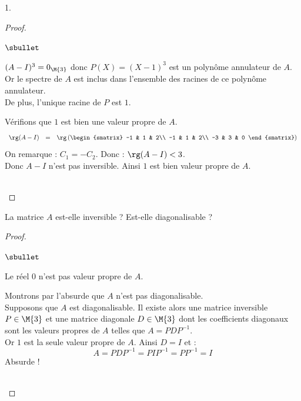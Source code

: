 \documentclass[11pt]{article}%
\begin{document}
\begin{noliste}{1.}
\begin{proof}~
\begin{noliste}{$\sbullet$}
\item $(A-I)^3=0_{\M{3}}$ donc $P(X)=(X-1)^3$ est un polynôme 
annulateur de $A$.\\
Or le spectre de $A$ est inclus dans l'ensemble des racines de ce 
polynôme 
annulateur.\\
De plus, l'unique racine de $P$ est $1$. 
\item Vérifions que $1$ est bien une valeur propre de $A$.
\[
\begin{array}{rcl}
  \rg(A-I) & = & \rg \left( 
    \begin{smatrix} 
      -1 & 1 & 2\\ 
      -1 & 1 & 2\\ 
      -3 & 3 & 0
    \end{smatrix} \right)
\end{array}
\]
On remarque : $C_1=-C_2$. Donc : $\rg(A-I)<3$.\\
Donc $A-I$ n'est pas inversible. Ainsi $1$ est bien valeur propre de
$A$.%
\end{noliste}

~\\[-1.4cm]
\end{proof}

\item La matrice $A$ est-elle inversible ? Est-elle diagonalisable ?

  \begin{proof}~
    \begin{noliste}{$\sbullet$}
    \item Le réel $0$ n'est pas valeur propre de $A$.
    \item Montrons par l'absurde que $A$ n'est pas diagonalisable.\\
      Supposons que $A$ est diagonalisable. Il existe alors une
      matrice inversible $P \in \M{3}$ et une matrice diagonale $D \in
      \M{3}$ dont les coefficients diagonaux sont les valeurs propres
      de $A$ telles que $A=PDP^{-1}$.\\
      Or $1$ est la seule valeur propre de $A$. Ainsi $D = I$ et :
      \[
      A = PDP^{-1} = PIP^{-1} = PP^{-1} = I
      \]
      Absurde !%
    \end{noliste}
    ~\\[-1.4cm]
  \end{proof}
\end{noliste}
\end{document}
